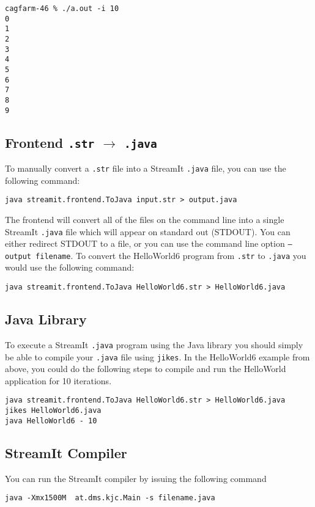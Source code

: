 \begin{verbatim}
cagfarm-46 % ./a.out -i 10
0
1
2
3
4
5
6
7
8
9
\end{verbatim}



\subsection{Frontend {\tt .str} $\rightarrow$ {\tt .java}}
To manually convert a {\tt .str} file into a StreamIt {\tt .java} 
file, you can use the following command:

\begin{verbatim}
java streamit.frontend.ToJava input.str > output.java
\end{verbatim}

The frontend will convert all of the files on the command line
into a single StreamIt {\tt .java} file which will appear on
standard out (STDOUT). You can either redirect STDOUT to a file, 
or you can use the command line option {\tt --output filename}.
To convert the HelloWorld6 program from {\tt .str} to {\tt .java}
you would use the following command:

\begin{verbatim}
java streamit.frontend.ToJava HelloWorld6.str > HelloWorld6.java
\end{verbatim}

\subsection{Java Library}
To execute a StreamIt {\tt .java} program using the Java library
you should simply be able to compile your {\tt .java} file using
{\tt jikes}. In the HelloWorld6 example from above,
you could do the following steps to compile and run the HelloWorld
application for 10 iterations.

\begin{verbatim}
java streamit.frontend.ToJava HelloWorld6.str > HelloWorld6.java
jikes HelloWorld6.java
java HelloWorld6 - 10
\end{verbatim}


\subsection{StreamIt Compiler}
You can run the StreamIt compiler by issuing the following command
\begin{verbatim}
java -Xmx1500M  at.dms.kjc.Main -s filename.java
\end{verbatim}

